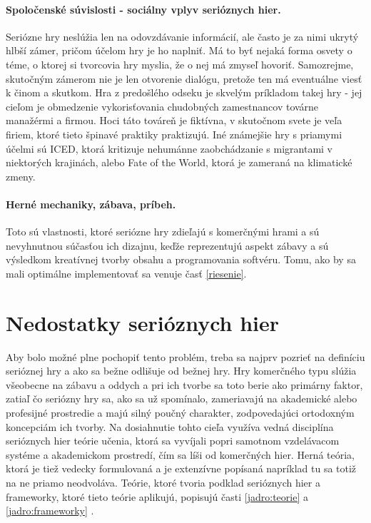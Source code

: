 \documentclass[10pt,twoside,slovak,a4paper]{article}
\begin{document}
\paragraph{Spoločenské súvislosti - sociálny vplyv serióznych hier.} Seriózne hry neslúžia len na odovzdávanie informácií, ale často je za nimi ukrytý hlbší zámer, pričom účelom hry je ho naplniť. Má to byť nejaká forma osvety o téme, o ktorej si tvorcovia hry myslia, že o nej má zmyseľ hovoriť. Samozrejme, skutočným zámerom nie je len otvorenie dialógu, pretože ten má eventuálne viesť k činom a skutkom. Hra z predošlého odseku je skvelým príkladom takej hry - jej cieľom je obmedzenie vykorisťovania chudobných zamestnancov továrne manažérmi a firmou. Hoci táto továreň je fiktívna, v skutočnom svete je veľa firiem, ktoré tieto špinavé praktiky praktizujú. Iné známejšie hry s priamymi účelmi sú ICED, ktorá kritizuje nehumánne zaobchádzanie s migrantami v niektorých krajinách, alebo Fate of the World, ktorá je zameraná na klimatické zmeny.
\paragraph{Herné mechaniky, zábava, príbeh.} Toto sú vlastnosti, ktoré seriózne hry zdieľajú s komerčnými hrami a sú nevyhnutnou súčasťou ich dizajnu, keďže reprezentujú aspekt zábavy a sú výsledkom kreatívnej tvorby obsahu a programovania softvéru. Tomu, ako by sa mali optimálne implementovať sa venuje časť \ref{riesenie}.

\section{Nedostatky serióznych hier} \label{problem}
Aby bolo možné plne pochopiť tento problém, treba sa najprv pozrieť na definíciu serióznej hry a ako sa bežne odlišuje od bežnej hry. Hry komerčného typu slúžia všeobecne na zábavu a oddych a pri ich tvorbe sa toto berie ako primárny faktor, zatiaľ čo seriózny hry sa, ako sa už spomínalo, zameriavajú na akademické alebo profesijné prostredie a majú silný poučný charakter, zodpovedajúci ortodoxným koncepciám ich tvorby. Na dosiahnutie tohto cieľa využíva vedná disciplína serióznych hier teórie učenia, ktorá sa vyvíjali popri samotnom vzdelávacom systéme a akademickom prostredí, čím sa líši od komerčných hier. Herná teória, ktorá je tiež vedecky formulovaná a je extenzívne popísaná napríklad tu \cite{owen2013game} sa totiž na ne priamo neodvoláva. Teórie, ktoré tvoria podklad serióznych hier a frameworky, ktoré tieto teórie aplikujú, popisujú časti \ref{jadro:teorie} a \ref{jadro:frameworky} .
\end{document}
